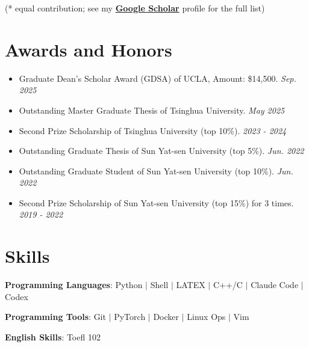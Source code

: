 \documentclass[12pt,a4paper]{article}
\newcommand{\scholar}{https://scholar.google.com/citations?user=JHWyBKIAAAAJ&hl=en}
\begin{document}
(* equal contribution; see my \textbf{\href{\scholar}{Google Scholar}} profile for the full list)
\section*{Awards and Honors}
\begin{itemize}[topsep=0pt]
\item Graduate Dean's Scholar Award (GDSA) of UCLA, Amount: \$14,500. \hfill\textit{Sep. 2025}
\item Outstanding Master Graduate Thesis of Tsinghua University. \hfill\textit{May 2025}
\item Second Prize Scholarship of Tsinghua University (top 10\%). \hfill\textit{2023 - 2024}
\item Outstanding Graduate Thesis of Sun Yat-sen University (top 5\%). \hfill\textit{Jun. 2022}
\item Outstanding Graduate Student of Sun Yat-sen University (top 10\%). \hfill\textit{Jun. 2022}
\item Second Prize Scholarship of Sun Yat-sen University (top 15\%) for 3 times. \hfill\textit{2019 - 2022}
\end{itemize}
\section*{Skills}
\textbf{Programming Languages}: Python $|$ Shell $|$ LATEX $|$ C++/C $|$ Claude Code $|$ Codex\par\vspace{7pt}
\textbf{Programming Tools}: Git $|$ PyTorch $|$ Docker $|$ Linux Ops $|$ Vim\par\vspace{7pt}
\textbf{English Skills}: Toefl 102
\end{document}
